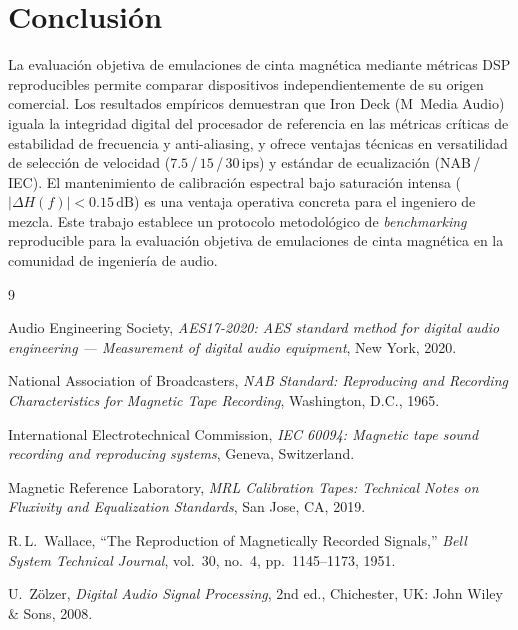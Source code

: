 \documentclass[10pt,conference]{IEEEtran}
\begin{document}
\section{Conclusión}

La evaluación objetiva de emulaciones de cinta magnética mediante métricas DSP reproducibles
permite comparar dispositivos independientemente de su origen comercial. Los resultados
empíricos demuestran que Iron Deck (M~Media Audio) iguala la integridad digital del procesador
de referencia en las métricas críticas de estabilidad de frecuencia y anti-aliasing, y ofrece
ventajas técnicas en versatilidad de selección de velocidad ($7.5$\,/\,$15$\,/\,$30\,\text{ips}$)
y estándar de ecualización (NAB\,/\,IEC). El mantenimiento de calibración espectral bajo
saturación intensa ($|\Delta H(f)|<0.15\,\text{dB}$) es una ventaja operativa concreta para
el ingeniero de mezcla. Este trabajo establece un protocolo metodológico de \emph{benchmarking}
reproducible para la evaluación objetiva de emulaciones de cinta magnética en la comunidad de
ingeniería de audio.

\begin{thebibliography}{9}

Audio Engineering Society, \emph{AES17-2020: AES standard method for digital audio engineering
--- Measurement of digital audio equipment}, New York, 2020.

National Association of Broadcasters, \emph{NAB Standard: Reproducing and Recording
Characteristics for Magnetic Tape Recording}, Washington, D.C., 1965.

International Electrotechnical Commission, \emph{IEC 60094: Magnetic tape sound recording and
reproducing systems}, Geneva, Switzerland.

Magnetic Reference Laboratory, \emph{MRL Calibration Tapes: Technical Notes on Fluxivity and
Equalization Standards}, San Jose, CA, 2019.

R.\,L.\ Wallace, ``The Reproduction of Magnetically Recorded Signals,'' \emph{Bell System
Technical Journal}, vol.~30, no.~4, pp.~1145--1173, 1951.

U.\ Zölzer, \emph{Digital Audio Signal Processing}, 2nd ed., Chichester, UK: John Wiley \& Sons,
2008.

\end{thebibliography}
\end{document}
